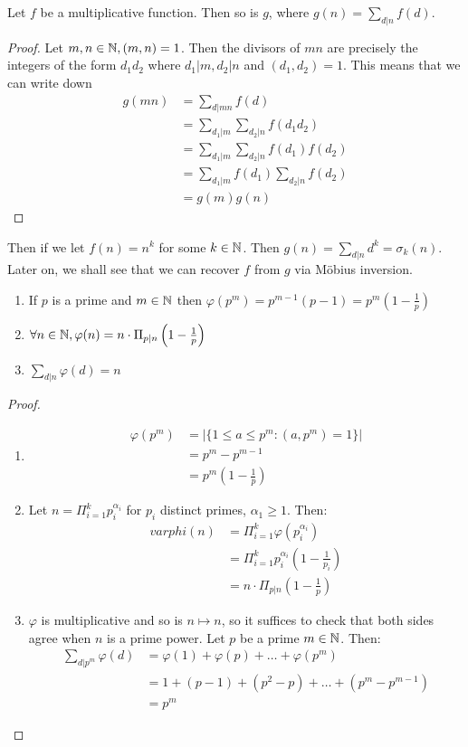 \documentclass[10pt,a4paper]{article}
\begin{document}
\begin{lemma}
Let $f$ be a multiplicative function. Then so is $g$, where $g(n) = \sum_{d|n} f(d)$.
\end{lemma}
\begin{proof}
Let $m,n \in \mathbb{N}, (m,n)=1$. Then the divisors of $mn$ are precisely the integers of the form $d_1d_2$ where $d_1|m, d_2|n$ and $(d_1,d_2)=1$. This means that we can write down
\begin{align*}
g(mn) &= \sum_{d|mn} f(d)\\
&= \sum_{d_1|m} \sum_{d_2|n} f(d_1d_2)\\
&= \sum_{d_1|m}\sum_{d_2|n} f(d_1)f(d_2)\\
&= \sum_{d_1|m} f(d_1) \sum_{d_2|n} f(d_2)\\
&= g(m)g(n)
\end{align*} 
\end{proof}
Then if we let $f(n) = n^k$ for some $k\in\mathbb{N}$. Then $g(n) = \sum_{d|n} d^k = \sigma_k(n)$. Later on, we shall see that we can recover $f$ from $g$ via M\"obius inversion.

\begin{theorem}
\item
\begin{enumerate}
\item If $p$ is a prime and $m\in\mathbb{N}$ then $\varphi(p^m) = p^{m-1}(p-1) = p^m\left(1-\frac{1}{p}\right)$
\item $\forall n\in\mathbb{N}, \varphi(n)=n\cdot\Pi_{p|n}\left(1-\frac{1}{p}\right)$
\item $\sum_{d|n} \varphi(d) = n$
\end{enumerate}
\end{theorem}
\begin{proof}
\item
\begin{enumerate}
\item 
\begin{align*}
\varphi(p^m) &= \left|\{1\leq a\leq p^m : (a,p^m)=1\}\right| \\
&= p^m-p^{m-1}\\
&= p^m\left(1-\frac{1}{p}\right)
\end{align*}
\item Let $n=\Pi_{i=1}^k p_i^{\alpha_i}$ for $p_i$ distinct primes, $\alpha_1 \geq 1$. Then:
\begin{align*}
varphi(n) &= \Pi_{i=1}^k \varphi(p_i^{\alpha_i})\\
&= \Pi_{i=1}^k p_i^{\alpha_i} \left(1-\frac{1}{p_i}\right)\\
&= n\cdot\Pi_{p|n}\left(1-\frac{1}{p}\right)
\end{align*}
\item $\varphi$ is multiplicative and so is $n\mapsto n$, so it suffices to check that both sides agree when $n$ is a prime power. Let $p$ be a prime $m\in\mathbb{N}$. Then:
\begin{align*}
\sum_{d|p^m} \varphi(d) &= \varphi(1) + \varphi(p) +\ldots +\varphi(p^m)\\
&= 1+ (p-1) + (p^2-p) + \ldots + (p^m-p^{m-1}) \\
&= p^m
\end{align*}
\end{enumerate}
\end{proof}
\end{document}
